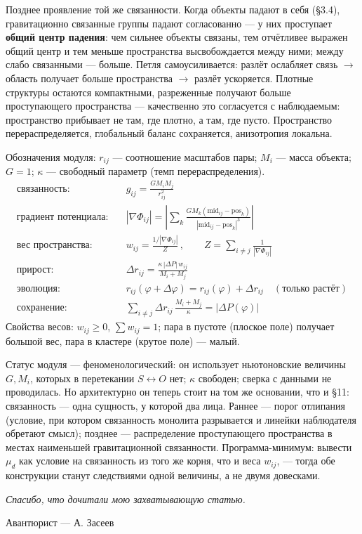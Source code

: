 \documentclass{article}
\begin{document}
Позднее проявление той же связанности. Когда объекты падают в себя (\S3.4), гравитационно связанные группы падают согласованно --- у них проступает \textbf{общий центр падения}: чем сильнее объекты связаны, тем отчётливее выражен общий центр и тем меньше пространства высвобождается между ними; между слабо связанными --- больше. Петля самоусиливается: разлёт ослабляет связь $\to$ область получает больше пространства $\to$ разлёт ускоряется. Плотные структуры остаются компактными, разреженные получают больше проступающего пространства --- качественно это согласуется с наблюдаемым: пространство прибывает не там, где плотно, а там, где пусто. Пространство перераспределяется, глобальный баланс сохраняется, анизотропия локальна.

Обозначения модуля: $r_{ij}$ --- соотношение масштабов пары; $M_i$ --- масса объекта; $G = 1$; $\kappa$ --- свободный параметр (темп перераспределения).
\begin{align}
\text{связанность:} &\quad g_{ij} = \frac{G M_i M_j}{r_{ij}^2} \\
\text{градиент потенциала:} &\quad |\nabla\Phi_{ij}| = \left| \sum_k \frac{G M_k (\text{mid}_{ij} - \text{pos}_k)}{|\text{mid}_{ij} - \text{pos}_k|^3} \right| \\
\text{вес пространства:} &\quad w_{ij} = \frac{1/|\nabla\Phi_{ij}|}{Z}\,, \qquad Z = \sum_{i\neq j} \frac{1}{|\nabla\Phi_{ij}|} \\
\text{прирост:} &\quad \Delta r_{ij} = \frac{\kappa\,|\Delta P|\,w_{ij}}{M_i + M_j} \\
\text{эволюция:} &\quad r_{ij}(\varphi+\Delta\varphi) = r_{ij}(\varphi) + \Delta r_{ij} \quad (\text{только растёт}) \\
\text{сохранение:} &\quad \sum_{i\neq j} \Delta r_{ij}\,\frac{M_i + M_j}{\kappa} = |\Delta P(\varphi)|
\end{align}
Свойства весов: $w_{ij} \ge 0$, $\sum w_{ij} = 1$; пара в пустоте (плоское поле) получает большой вес, пара в кластере (крутое поле) --- малый.

Статус модуля --- феноменологический: он использует ньютоновские величины $G, M_i$, которых в перетекании $S \leftrightarrow O$ нет; $\kappa$ свободен; сверка с данными не проводилась. Но архитектурно он теперь стоит на том же основании, что и \S11: связанность --- одна сущность, у которой два лица. Раннее --- порог отлипания (условие, при котором связанность монолита разрывается и линейки наблюдателя обретают смысл); позднее --- распределение проступающего пространства в местах наименьшей гравитационной связанности. Программа-минимум: вывести $\mu_d$ как условие на связанность из того же корня, что и веса $w_{ij}$, --- тогда обе конструкции станут следствиями одной величины, а не двумя довесками.

\bigskip
\noindent\textit{Спасибо, что дочитали мою захватывающую статью.}

\medskip
\noindent Авантюрист --- А. Засеев
\end{document}
